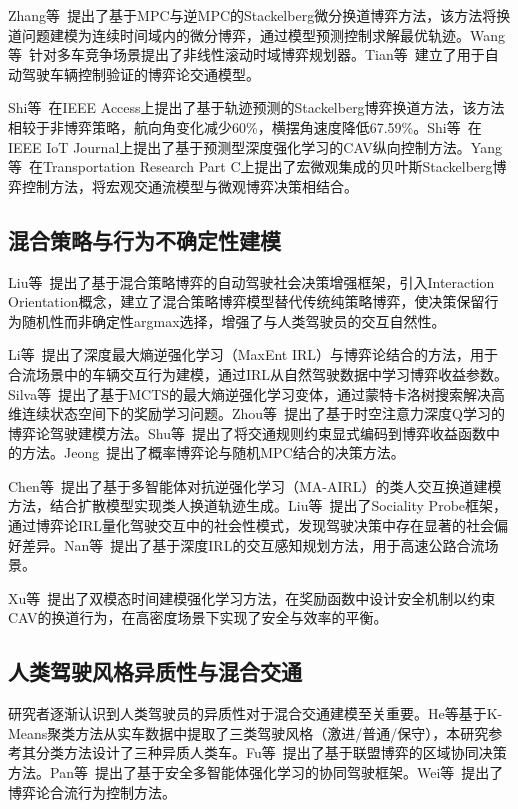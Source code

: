 Zhang等~\cite{zhang2024stackelberg}提出了基于MPC与逆MPC的Stackelberg微分换道博弈方法，该方法将换道问题建模为连续时间域内的微分博弈，通过模型预测控制求解最优轨迹。Wang等~\cite{wang2021game}针对多车竞争场景提出了非线性滚动时域博弈规划器。Tian等~\cite{tian2022game}建立了用于自动驾驶车辆控制验证的博弈论交通模型。

Shi等~\cite{shi2025stackelberg}在IEEE Access上提出了基于轨迹预测的Stackelberg博弈换道方法，该方法相较于非博弈策略，航向角变化减少60\%，横摆角速度降低67.59\%。Shi等~\cite{shi2025predictive}在IEEE IoT Journal上提出了基于预测型深度强化学习的CAV纵向控制方法。Yang等~\cite{yang2025macro}在Transportation Research Part C上提出了宏微观集成的贝叶斯Stackelberg博弈控制方法，将宏观交通流模型与微观博弈决策相结合。

\subsection{混合策略与行为不确定性建模}
Liu等~\cite{liu2024enhancing}提出了基于混合策略博弈的自动驾驶社会决策增强框架，引入Interaction Orientation概念，建立了混合策略博弈模型替代传统纯策略博弈，使决策保留行为随机性而非确定性argmax选择，增强了与人类驾驶员的交互自然性。

Li等~\cite{li2024simulation}提出了深度最大熵逆强化学习（MaxEnt IRL）与博弈论结合的方法，用于合流场景中的车辆交互行为建模，通过IRL从自然驾驶数据中学习博弈收益参数。Silva等~\cite{silva2024maximum}提出了基于MCTS的最大熵逆强化学习变体，通过蒙特卡洛树搜索解决高维连续状态空间下的奖励学习问题。Zhou等~\cite{zhou2025game}提出了基于时空注意力深度Q学习的博弈论驾驶建模方法。Shu等~\cite{shu2025decision}提出了将交通规则约束显式编码到博弈收益函数中的方法。Jeong~\cite{jeong2023probabilistic}提出了概率博弈论与随机MPC结合的决策方法。

Chen等~\cite{chen2025human}提出了基于多智能体对抗逆强化学习（MA-AIRL）的类人交互换道建模方法，结合扩散模型实现类人换道轨迹生成。Liu等~\cite{liu2024sociality}提出了Sociality Probe框架，通过博弈论IRL量化驾驶交互中的社会性模式，发现驾驶决策中存在显著的社会偏好差异。Nan等~\cite{nan2024interaction}提出了基于深度IRL的交互感知规划方法，用于高速公路合流场景。

Xu等~\cite{xu2026bimodal}提出了双模态时间建模强化学习方法，在奖励函数中设计安全机制以约束CAV的换道行为，在高密度场景下实现了安全与效率的平衡。

\subsection{人类驾驶风格异质性与混合交通}
研究者逐渐认识到人类驾驶员的异质性对于混合交通建模至关重要。He等基于K-Means聚类方法从实车数据中提取了三类驾驶风格（激进/普通/保守），本研究参考其分类方法设计了三种异质人类车。Fu等~\cite{fu2025regional}提出了基于联盟博弈的区域协同决策方法。Pan等~\cite{pan2025toward}提出了基于安全多智能体强化学习的协同驾驶框架。Wei等~\cite{wei2022game}提出了博弈论合流行为控制方法。

